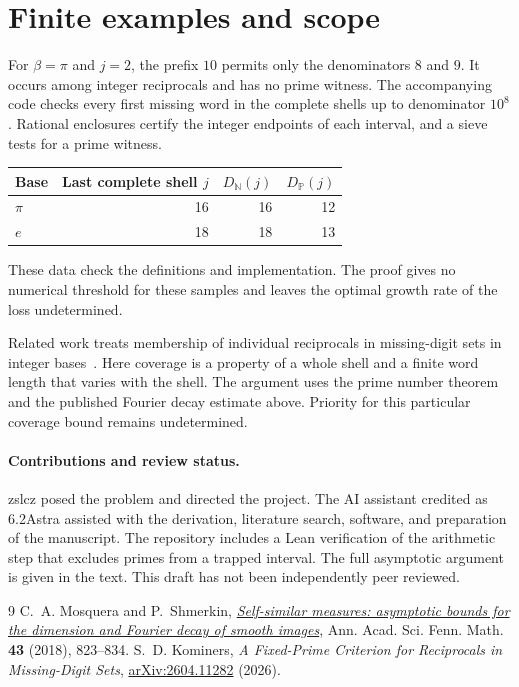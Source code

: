 \documentclass[11pt,a4paper]{article}
\newcommand{\DP}{D_{\mathbb P}}
\newcommand{\DN}{D_{\mathbb N}}
\begin{document}
\section{Finite examples and scope}
For $\beta=\pi$ and $j=2$, the prefix $10$ permits only the denominators
$8$ and $9$. It occurs among integer reciprocals and has no prime witness.
The accompanying code checks every first missing word in the complete
shells up to denominator $10^8$. Rational enclosures certify the integer
endpoints of each interval, and a sieve tests for a prime witness.
\begin{center}
\begin{tabular}{lrrr}
\toprule
Base & Last complete shell $j$ & $\DN(j)$ & $\DP(j)$\\
\midrule
$\pi$ & 16 & 16 & 12\\
$e$   & 18 & 18 & 13\\
\bottomrule
\end{tabular}
\end{center}
These data check the definitions and implementation. The proof gives no
numerical threshold for these samples and leaves the optimal growth rate
of the loss undetermined.

Related work treats membership of individual reciprocals in missing-digit
sets in integer bases~\cite{kom}. Here coverage is a property of a whole
shell and a finite word length that varies with the shell. The argument
uses the prime number theorem and the published Fourier decay estimate
above. Priority for this particular coverage bound remains undetermined.

\paragraph{Contributions and review status.}
zslcz posed the problem and directed the project. The AI assistant
credited as 6.2Astra assisted
with the derivation, literature search, software, and preparation of the
manuscript. The repository includes a Lean verification of the arithmetic
step that excludes primes from a trapped interval. The full asymptotic
argument is given in the text. This draft has not been independently
peer reviewed.
\begin{thebibliography}{9}
 C.~A. Mosquera and P.~Shmerkin,
\href{https://www.acadsci.fi/mathematica/Vol43/vol43pp0823-0834.pdf}
{\emph{Self-similar measures: asymptotic bounds for the dimension and Fourier decay of smooth images}},
Ann. Acad. Sci. Fenn. Math. \textbf{43} (2018), 823--834.
 S.~D. Kominers,
\emph{A Fixed-Prime Criterion for Reciprocals in Missing-Digit Sets},
\href{https://arxiv.org/abs/2604.11282}{arXiv:2604.11282} (2026).
\end{thebibliography}
\end{document}
